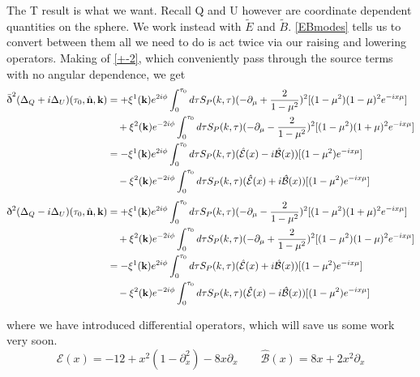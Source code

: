 \documentclass[a4paper,10pt]{article}
\renewcommand{\v}[1]{\mathbf{#1}}
\newcommand{\unit}[1]{\hat{\v{#1}}}
\newcommand{\sr}{\text{\normalfont\dh}}
\renewcommand{\sl}{\bar{\text{\normalfont\dh}}}
\begin{document}
The T result is what we want. Recall Q and U however are coordinate dependent quantities on the sphere. We work instead with $\tilde{E}$ and $\tilde{B}$. \ref{EBmodes} tells us to convert between them all we need to do is act twice via our raising and lowering operators. Making of \ref{+-2}, which conveniently pass through the source terms with no  angular dependence, we get
\begin{equation}\begin{split}
\sl^2(\Delta_Q+i\Delta_U)(\tau_0,\unit{n},\v{k}) &= + \xi^1(\v{k})e^{2i\phi}\int_0^{\tau_0}d\tau S_P(k,\tau)(-\partial_\mu+\frac{2}{1-\mu^2})^2[(1-\mu^2)(1-\mu)^2 e^{-ix\mu}]\\
&\quad + \xi^2(\v{k})e^{-2i\phi}\int_0^{\tau_0}d\tau S_P(k,\tau)(-\partial_\mu-\frac{2}{1-\mu^2})^2[(1-\mu^2)(1+\mu)^2 e^{-ix\mu}]\\
&= -\xi^1(\v{k})e^{2i\phi}\int_0^{\tau_0}d\tau S_P(k,\tau)(\hat{\mathcal{E}}(x)-i\hat{\mathcal{B}}(x))[(1-\mu^2) e^{-ix\mu}] \\
&\quad - \xi^2(\v{k})e^{-2i\phi}\int_0^{\tau_0}d\tau S_P(k,\tau)(\hat{\mathcal{E}}(x)+i\hat{\mathcal{B}}(x))[(1-\mu^2) e^{-ix\mu}] 
\end{split}\end{equation}
\begin{equation}\begin{split}
\sr^2(\Delta_Q-i\Delta_U)(\tau_0,\unit{n},\v{k}) &= +\xi^1(\v{k})e^{2i\phi}\int_0^{\tau_0}d\tau S_P(k,\tau)(-\partial_\mu-\frac{2}{1-\mu^2})^2[(1-\mu^2)(1+\mu)^2 e^{-ix\mu}] \\ 
&\quad + \xi^2(\v{k})e^{-2i\phi}\int_0^{\tau_0}d\tau S_P(k,\tau)(-\partial_\mu+\frac{2}{1-\mu^2})^2[(1-\mu^2)(1-\mu)^2 e^{-ix\mu}]\\
&= -\xi^1(\v{k})e^{2i\phi}\int_0^{\tau_0}d\tau S_P(k,\tau)(\hat{\mathcal{E}}(x)+i\hat{\mathcal{B}}(x))[(1-\mu^2) e^{-ix\mu}] \\
&\quad - \xi^2(\v{k})e^{-2i\phi}\int_0^{\tau_0}d\tau S_P(k,\tau)(\hat{\mathcal{E}}(x)-i\hat{\mathcal{B}}(x))[(1-\mu^2) e^{-ix\mu}] 
\end{split}\end{equation}

where we have introduced differential operators, which will save us some work very soon.
\begin{equation}
\hat{\mathcal{E}}(x)=-12+x^2(1-\partial^2_x)-8x\partial_x \qquad \mathcal{\hat{B}}(x) = 8x+2x^2\partial_x
\end{equation}
\end{document}

